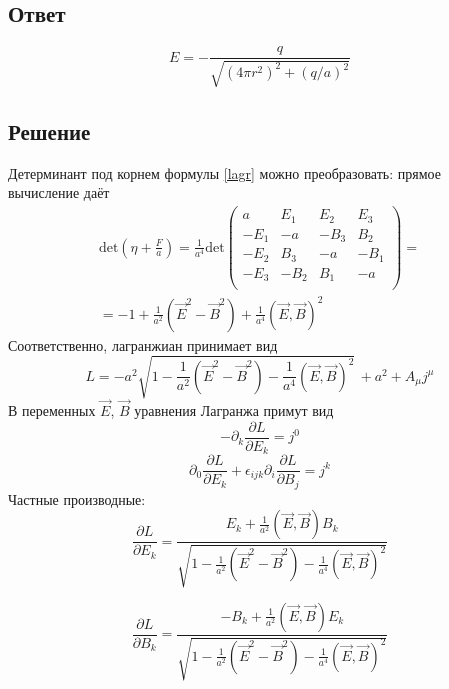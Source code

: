 \documentclass{article}
\begin{document}
\subsection{Ответ}
\begin{equation}
	E = - \frac{q}{\sqrt{(4\pi r^2)^2 + (q/a)^2}}
\end{equation}
\subsection{Решение}
Детерминант под корнем формулы \ref{lagr} можно преобразовать: прямое вычисление даёт 
\begin{multline}
\mathrm{det}\left(\eta + \frac{F}{a}\right) = 
\frac{1}{a^4}\mathrm{det}\begin{pmatrix}
a & E_1 & E_2 & E_3 \\ 
-E_1 &-a & -B_3 & B_2 \\
-E_2 & B_3 &-a    &-B_1 \\
-E_3 & -B_2 & B_1 &-a \\
\end{pmatrix} = \\
= -1 + \frac{1}{a^2} (\vec{E}^2 - \vec{B}^2) + \frac{1}{a^4} (\vec{E}, \vec{B})^2
\end{multline}
Соответственно, лагранжиан принимает вид
\begin{equation}
	L = -a^2 \sqrt{1 - \frac{1}{a^2} 
		(\vec{E}^2 - \vec{B}^2) - \frac{1}{a^4} (\vec{E}, \vec{B})^2} 
			\,+ a^2 + A_\mu j^\mu
\end{equation}
В переменных $\vec{E}$, $\vec{B}$ уравнения Лагранжа примут вид
\begin{equation}
	\label{dive}
	-\partial_k \frac{\partial L}{\partial E_k} = j^0
\end{equation}
\begin{equation}
	\label{roth}
	\partial_{0}\frac{\partial L}{\partial E_k} + 
	\epsilon_{ijk}\partial_{i}\frac{\partial L}{\partial B_j} = j^k
\end{equation}
Частные производные:
\begin{equation}
	\frac{\partial L}{\partial E_k} = 
		\frac{E_k + \frac{1}{a^2}(\vec{E}, \vec{B})B_k}
		{\sqrt{
		1 - 
		\frac{1}{a^2}(\vec{E}^2 - \vec{B}^2) - 
		\frac{1}{a^4} (\vec{E}, \vec{B})^2}
		}
\end{equation}

\begin{equation}
	\frac{\partial L}{\partial B_k} = 
		\frac{-B_k + \frac{1}{a^2}(\vec{E}, \vec{B})E_k}
		{\sqrt{
		1 - 
		\frac{1}{a^2}(\vec{E}^2 - \vec{B}^2) - 
		\frac{1}{a^4} (\vec{E}, \vec{B})^2}
		}
\end{equation}
\end{document}
